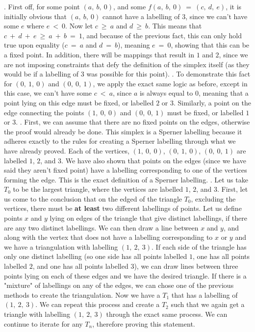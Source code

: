 \documentclass{article}
\begin{document}
\newline{}. First off, for some point $(a, \ b, \ 0)$, and some $f(a, \ b, \ 0) \ = \ (c, \ d, \ e)$, it is initially obvious that $(a, \ b, \ 0)$ cannot have a labelling of $3$, since we can't have some $e$ where $e \ < \ 0$. Now let $c \ \geq \ a$ and $d \ \geq \ b$. This means that $c \ + \ d \ + \ e \ \geq \ a \ + \ b \ = \ 1$, and because of the previous fact, this can only hold true upon equality ($c \ = \ a$ and $d \ = \ b$), meaning $e \ = \ 0$, showing that this can be a fixed point. In addition, there will be mappings that result in $1$ and $2$, since we are not imposing constraints that defy the definition of the simplex itself (as they would be if a labelling of $3$ was possible for this point).
\newline{}. To demonstrate this fact for $(0, \ 1, \ 0)$ and $(0, \ 0, \ 1)$, we apply the exact same logic as before, except in this case, we can't have some $c \ < \ a$, since $a$ is always equal to $0$, meaning that a point lying on this edge must be fixed, or labelled $2$ or $3$. Similarly, a point on the edge connecting the points $(1, \ 0, \ 0)$ and $(0, \ 0, \ 1)$ must be fixed, or labelled $1$ or $3$.
\newline{}. First, we can assume that there are no fixed points on the edges, otherwise the proof would already be done. This simplex is a Sperner labelling because it adheres exactly to the rules for creating a Sperner labelling through what we have already proved. Each of the vertices, $(1, \ 0, \ 0)$, $(0, \ 1, \ 0)$, $(0, \ 0, \ 1)$ are labelled $1$, $2$, and $3$. We have also shown that points on the edges (since we have said they aren't fixed point) have a labelling corresponding to one of the vertices forming the edge. This is the exact definition of a Sperner labelling.
\newline{}. Let us take $T_0$ to be the largest triangle, where the vertices are labelled $1$, $2$, and $3$. First, let us come to the conclusion that on the edged of the triangle $T_0$, excluding the vertices, there must be \textbf{at least} two different labellings of points. Let us define points $x$ and $y$ lying on edges of the triangle that give distinct labellings, if there are any two distinct labellings. We can then draw a line between $x$ and $y$, and along with the vertex that does not have a labelling corresponding to $x$ or $y$ and we have a triangulation with labelling $(1, \ 2, \ 3)$. If each side of the triangle has only one distinct labelling (so one side has all points labelled $1$, one has all points labelled $2$, and one has all points labelled $3$), we can draw lines between three points lying on each of these edges and we have the desired triangle. If there is a "mixture" of labellings on any of the edges, we can chose one of the previous methods to create the triangulation. Now we have a $T_1$ that has a labelling of $(1, \ 2, \ 3)$. We can repeat this process and create a $T_2$ such that we again get a triangle with labelling $(1, \ 2, \ 3)$ through the exact same process. We can continue to iterate for any $T_n$, therefore proving this statement.
\newline\newline
\end{document}
